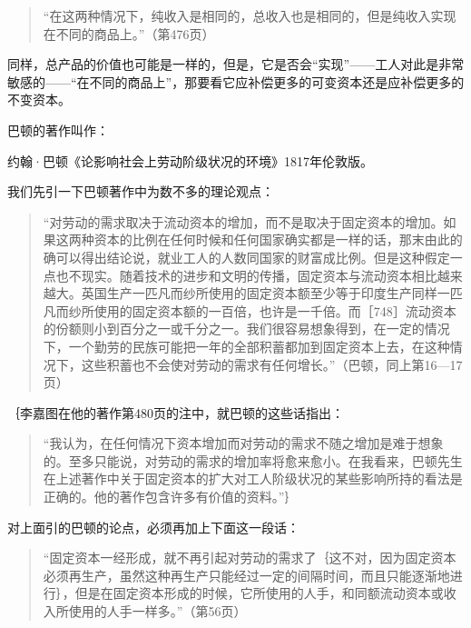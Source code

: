 \begin{quote}{“在这两种情况下，纯收入是相同的，总收入也是相同的，但是纯收入实现在不同的商品上。”（第476页）}\end{quote}

同样，总产品的价值也可能是一样的，但是，它是否会“实现”——工人对此是非常敏感的——“在不同的商品上”，那要看它应补偿更多的可变资本还是应补偿更多的不变资本。



巴顿的著作叫作：

约翰·巴顿《论影响社会上劳动阶级状况的环境》1817年伦敦版。

我们先引一下巴顿著作中为数不多的理论观点：

\begin{quote}{“对劳动的需求取决于流动资本的增加，而不是取决于固定资本的增加。如果这两种资本的比例在任何时候和任何国家确实都是一样的话，那末由此的确可以得出结论说，就业工人的人数同国家的财富成比例。但是这种假定一点也不现实。随着技术的进步和文明的传播，固定资本与流动资本相比越来越大。英国生产一匹凡而纱所使用的固定资本额至少等于印度生产同样一匹凡而纱所使用的固定资本额的一百倍，也许是一千倍。而［748］流动资本的份额则小到百分之一或千分之一。我们很容易想象得到，在一定的情况下，一个勤劳的民族可能把一年的全部积蓄都加到固定资本上去，在这种情况下，这些积蓄也不会使对劳动的需求有任何增长。”（巴顿，同上第16—17页）}\end{quote}

｛李嘉图在他的著作第480页的注中，就巴顿的这些话指出：

\begin{quote}{“我认为，在任何情况下资本增加而对劳动的需求不随之增加是难于想象的。至多只能说，对劳动的需求的增加率将愈来愈小。在我看来，巴顿先生在上述著作中关于固定资本的扩大对工人阶级状况的某些影响所持的看法是正确的。他的著作包含许多有价值的资料。”｝}\end{quote}

对上面引的巴顿的论点，必须再加上下面这一段话：

\begin{quote}{“固定资本一经形成，就不再引起对劳动的需求了｛这不对，因为固定资本必须再生产，虽然这种再生产只能经过一定的间隔时间，而且只能逐渐地进行｝，但是在固定资本形成的时候，它所使用的人手，和同额流动资本或收入所使用的人手一样多。”（第56页）}\end{quote}

